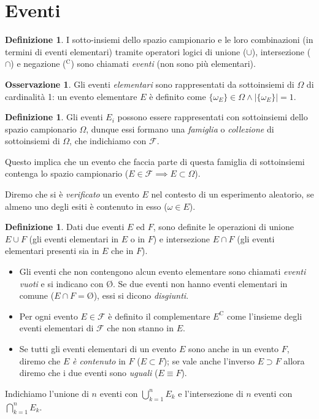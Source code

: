 \documentclass[12pt,openany]{amsbook}
\theoremstyle{plain}
\numberwithin{equation}{section} %
\theoremstyle{definition}
\newtheorem{defn}[thm]{Definizione}
\newtheorem{obsv}[thm]{Osservazione}
\begin{document}
            \section{Eventi}\label{sec:Eventi}
            \begin{defn}
                I sotto-insiemi dello spazio campionario e le loro combinazioni (in termini di eventi elementari) tramite operatori logici di unione ($\cup$), intersezione ($\cap$) e negazione ($^{\text{C}}$) sono chiamati \textit{eventi} (non sono più elementari).
            \end{defn}
            \begin{obsv}
                Gli eventi \textit{elementari} sono rappresentati da sottoinsiemi di $\Omega$ di cardinalità 1: un evento elementare $E$ è definito come $\{\omega_E\} \in \Omega \land |\{\omega_E\}| = 1$.
            \end{obsv}
            \begin{defn}
                Gli eventi $E_i$ possono essere rappresentati con sottoinsiemi dello spazio campionario $\Omega$, dunque essi formano una \textit{famiglia} o \textit{collezione} di sottoinsiemi di $\Omega$, che indichiamo con $\mathscr{F}$.

                Questo implica che un evento che faccia parte di questa famiglia di sottoinsiemi contenga lo spazio campionario ($E \in \mathscr{F} \implies E \subset \Omega$).

                Diremo che si è \textit{verificato} un evento $E$ nel contesto di un esperimento aleatorio, se almeno uno degli esiti è contenuto in esso ($\omega \in E$).
            \end{defn}
            \begin{defn}
                Dati due eventi $E$ ed $F$, sono definite le operazioni di unione $E \cup F$ (gli eventi elementari in $E$ o in $F$) e intersezione $E \cap F$ (gli eventi elementari presenti sia in $E$ che in $F$).
                \begin{itemize}
                    \item Gli eventi che non contengono alcun evento elementare sono chiamati \textit{eventi vuoti} e si indicano con \O. Se due eventi non hanno eventi elementari in comune ($E \cap F = \text{\O}$), essi si dicono \textit{disgiunti}.
                    \item Per ogni evento $E \in \mathscr{F}$ è definito il complementare $E^{\text{C}}$ come l'insieme degli eventi elementari di $\mathscr{F}$ che non stanno in $E$.
                    \item Se tutti gli eventi elementari di un evento $E$ sono anche in un evento  $F$, diremo che $E$ \textit{è contenuto} in  $F$ ($E \subset F$); se vale anche l'inverso $E \supset F$ allora diremo che i due eventi sono \textit{uguali} ($E \equiv F$).
                \end{itemize}
                Indichiamo l'unione di $n$ eventi con  $\bigcup_{k=1}^{n} E_k$ e l'intersezione di  $n$ eventi con $\bigcap_{k=1}^{n} E_k$.
            \end{defn}
\end{document}

